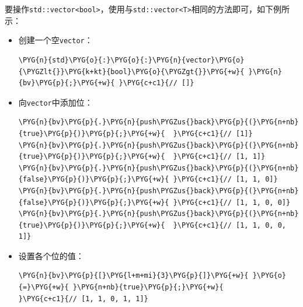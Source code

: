 
要操作\texttt{std::\allowbreak{}vector<\allowbreak{}bool>}，使用与\texttt{std::\allowbreak{}vector<\allowbreak{}T>}相同的方法即可，如下例所示：



\begin{itemize}
\item 创建一个空\texttt{vector}：



\begin{codeblockbg}
\begin{Verbatim}[commandchars=\\\{\},breaklines=true,breakanywhere=true,fontsize=\codefont,xleftmargin=17bp]
\PYG{n}{std}\PYG{o}{:}\PYG{o}{:}\PYG{n}{vector}\PYG{o}{\PYGZlt{}}\PYG{k+kt}{bool}\PYG{o}{\PYGZgt{}}\PYG{+w}{ }\PYG{n}{bv}\PYG{p}{;}\PYG{+w}{ }\PYG{c+c1}{// []}
\end{Verbatim}
\end{codeblockbg}



\item 向\texttt{vector}中添加位：



\begin{codeblockbg}
\begin{Verbatim}[commandchars=\\\{\},breaklines=true,breakanywhere=true,fontsize=\codefont,xleftmargin=17bp]
\PYG{n}{bv}\PYG{p}{.}\PYG{n}{push\PYGZus{}back}\PYG{p}{(}\PYG{n+nb}{true}\PYG{p}{)}\PYG{p}{;}\PYG{+w}{  }\PYG{c+c1}{// [1]}
\PYG{n}{bv}\PYG{p}{.}\PYG{n}{push\PYGZus{}back}\PYG{p}{(}\PYG{n+nb}{true}\PYG{p}{)}\PYG{p}{;}\PYG{+w}{  }\PYG{c+c1}{// [1, 1]}
\PYG{n}{bv}\PYG{p}{.}\PYG{n}{push\PYGZus{}back}\PYG{p}{(}\PYG{n+nb}{false}\PYG{p}{)}\PYG{p}{;}\PYG{+w}{ }\PYG{c+c1}{// [1, 1, 0]}
\PYG{n}{bv}\PYG{p}{.}\PYG{n}{push\PYGZus{}back}\PYG{p}{(}\PYG{n+nb}{false}\PYG{p}{)}\PYG{p}{;}\PYG{+w}{ }\PYG{c+c1}{// [1, 1, 0, 0]}
\PYG{n}{bv}\PYG{p}{.}\PYG{n}{push\PYGZus{}back}\PYG{p}{(}\PYG{n+nb}{true}\PYG{p}{)}\PYG{p}{;}\PYG{+w}{  }\PYG{c+c1}{// [1, 1, 0, 0, 1]}
\end{Verbatim}
\end{codeblockbg}



\item 设置各个位的值：



\begin{codeblockbg}
\begin{Verbatim}[commandchars=\\\{\},breaklines=true,breakanywhere=true,fontsize=\codefont,xleftmargin=17bp]
\PYG{n}{bv}\PYG{p}{[}\PYG{l+m+mi}{3}\PYG{p}{]}\PYG{+w}{ }\PYG{o}{=}\PYG{+w}{ }\PYG{n+nb}{true}\PYG{p}{;}\PYG{+w}{        }\PYG{c+c1}{// [1, 1, 0, 1, 1]}
\end{Verbatim}
\end{codeblockbg}



\end{itemize}

